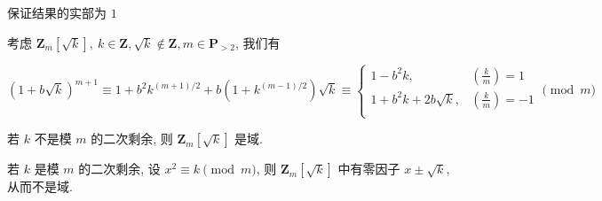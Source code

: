 保证结果的实部为 \(1\)

考虑 \(\mathbf{Z}_m\left[\sqrt{k}\right],~k\in\mathbf{Z},\sqrt{k}\notin \mathbf{Z},m\in\mathbf{P}_{>2}\), 我们有

\[
    \left(1+b\sqrt{k}\right)^{m+1}\equiv 1+b^2 k^{(m+1)/2} + b\left(1+k^{(m-1)/2}\right)\sqrt{k} \equiv\begin{cases}
        1-b^2 k,              & \left(\frac{k}{m}\right)=1  \\
        1+b^2 k + 2b\sqrt{k}, & \left(\frac{k}{m}\right)=-1 \\
    \end{cases} \pmod m
\]

若 \(k\) 不是模 \(m\) 的二次剩余, 则 \(\mathbf{Z}_m\left[\sqrt{k}\right]\) 是域.

若 \(k\) 是模 \(m\) 的二次剩余, 设 \(x^2\equiv k\pmod m\), 则 \(\mathbf{Z}_m\left[\sqrt{k}\right]\) 中有零因子 \(x\pm\sqrt{k}\), 从而不是域.

